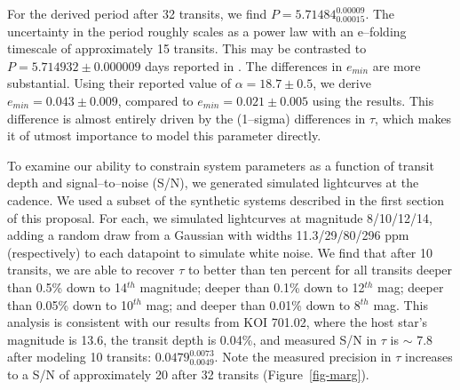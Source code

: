 For the derived period after 32 transits, we find $P =
5.71484_{0.00015}^{0.00009}$.  The uncertainty in the period roughly
scales as a power law with an e--folding timescale of approximately 15
transits.  This may be contrasted to $P = 5.714932 \pm 0.000009$ days
reported in \cite{2013arXiv1304.7387B}.  The differences in $e_{min}$
are more substantial.  Using their reported value of $\alpha =
18.7 \pm 0.5$, we derive $e_{min} = 0.043 \pm 0.009$, compared to
$e_{min} = 0.021 \pm 0.005$ using the \cite{2013arXiv1304.7387B}
results.  This difference is almost entirely driven by the (1--sigma)
differences in $\tau$, which makes it of utmost importance to model
this parameter directly.

To examine our ability to constrain system parameters as a function of
transit depth and signal--to--noise (S/N), we generated simulated
lightcurves at the \kepler cadence.  We used a subset of the synthetic
systems described in the first section of this proposal.  For each, we
simulated lightcurves at magnitude 8/10/12/14, adding a random draw
from a Gaussian with widths 11.3/29/80/296 ppm (respectively) to each
datapoint to simulate white noise.  We find that after 10 transits, we
are able to recover $\tau$ to better than ten percent for all transits
deeper than 0.5\% down to 14$^{th}$ magnitude; deeper than 0.1\% down
to 12$^{th}$ mag; deeper than 0.05\% down to 10$^{th}$ mag; and deeper
than 0.01\% down to 8$^{th}$ mag.  This analysis is consistent with
our results from KOI 701.02, where the host star's magnitude is 13.6,
the transit depth is 0.04\%, and measured S/N in $\tau$ is $\sim$ 7.8
after modeling 10 transits: $0.0479_{0.0049}^{0.0073}$.  Note the
measured precision in $\tau$ increases to a S/N of approximately 20
after 32 transits (Figure~\ref{fig-marg}).


